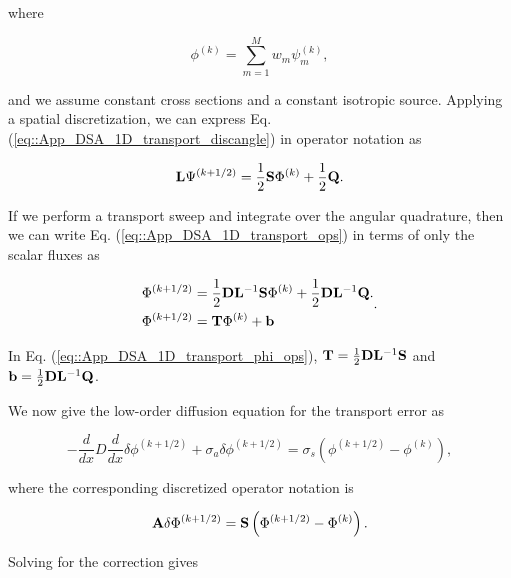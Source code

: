 \noindent where

\begin{equation}
\label{eq::App_DSA_1D_angint}
\phi^{(k)} = \sum_{m=1}^M w_m \psi_m^{(k)},
\end{equation}

\noindent and we assume constant cross sections and a constant isotropic source. Applying a spatial discretization, we can express Eq. (\ref{eq::App_DSA_1D_transport_discangle}) in operator notation as 

\begin{equation}
\label{eq::App_DSA_1D_transport_ops}
{\bf L} \Psi^{(k+1/2)} = \frac{1}{2} {\bf S} \Phi^{(k)}  + \frac{1}{2} {\bf Q}.
\end{equation}

\noindent If we perform a transport sweep and integrate over the angular quadrature, then we can write Eq. (\ref{eq::App_DSA_1D_transport_ops}) in terms of only the scalar fluxes as

\begin{equation}
\label{eq::App_DSA_1D_transport_phi_ops}
\begin{aligned}
 \Phi^{(k+1/2)} &= \frac{1}{2} {\bf D} {\bf L}^{-1} {\bf S} \Phi^{(k)}  + \frac{1}{2} {\bf D} {\bf L}^{-1} {\bf Q}. \\
 \Phi^{(k+1/2)} &= {\bf T}\Phi^{(k)} + {\bf b}
\end{aligned}.
\end{equation}

\noindent In Eq. (\ref{eq::App_DSA_1D_transport_phi_ops}), ${\bf T}=\frac{1}{2} {\bf D} {\bf L}^{-1} {\bf S}$ and ${\bf b} = \frac{1}{2} {\bf D} {\bf L}^{-1} {\bf Q}$.

We now give the low-order diffusion equation for the transport error as 

\begin{equation}
\label{eq::App_DSA_1D_diff_eq}
- \frac{d}{dx} D \frac{d }{dx} \delta \phi^{(k+1/2)}+ \sigma_a \delta \phi^{(k+1/2)} = \sigma_s \left(  \phi^{(k+1/2)} - \phi^{(k)} \right) ,
\end{equation}

\noindent where the corresponding discretized operator notation is

\begin{equation}
\label{eq::App_DSA_1D_diff_ops}
{\bf A} \delta \Phi^{(k+1/2)} = {\bf S}\left( \Phi^{(k+1/2)} -  \Phi^{(k)}   \right) .
\end{equation}

\noindent Solving for the correction gives

